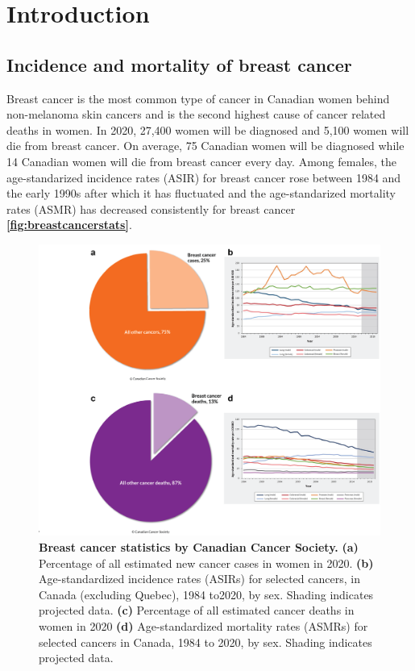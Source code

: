 
\chapter{Introduction}
\label{ch:Introduction}

\section{Incidence and mortality of breast cancer}
Breast cancer is the most common type of cancer in Canadian women behind non-melanoma skin cancers and is the second highest cause of cancer related deaths in women. In 2020, 27,400 women will be diagnosed and 5,100 women will die from breast cancer. On average, 75 Canadian women will be diagnosed while 14 Canadian women will die from breast cancer every day. Among females, the age-standarized incidence rates (ASIR) for breast cancer rose between 1984 and the early 1990s after which it has fluctuated and the age-standarized mortality rates (ASMR) has decreased consistently for breast cancer \cite{canadian2020canadian} \textbf{\autoref{fig:breastcancerstats}}.

\begin{figure}
\centering
\includegraphics[width=\textwidth]{Figures/breastcancerstats.png}
	\caption[Breast cancer statistics by Canadian cancer society ]
	{\small
	    \textbf{Breast cancer statistics by Canadian Cancer Society.}
	    \textbf{(a)} Percentage of all estimated new cancer cases in women in 2020.
	    \textbf{(b)} Age-standardized incidence rates (ASIRs) for selected cancers, in Canada (excluding Quebec), 1984 to2020, by sex. Shading indicates projected data.
	    \textbf{(c)} Percentage of all estimated cancer deaths in women in 2020
	     \textbf{(d)} Age-standardized mortality rates (ASMRs) for selected cancers in Canada, 1984 to 2020, by sex. Shading indicates projected data.
	}
	\label{fig:breastcancerstats}
\end{figure}

